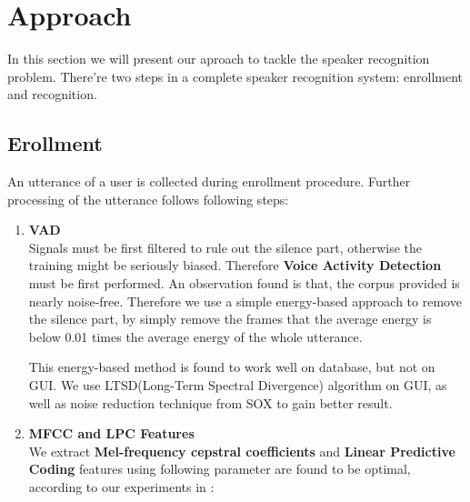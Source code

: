 \section{Approach}
	In this section we will present our aproach to tackle the speaker recognition problem.
	There're two steps in a complete speaker recognition system: enrollment and recognition.

\subsection{Erollment}
	\label{sec:approach_enrollment}
	An utterance of a user is collected during enrollment procedure.
	Further processing of the utterance follows following steps:
	\begin{enumerate}
		\item \textbf{VAD} \\
            Signals must be first filtered to rule out the silence part, otherwise the
            training might be seriously biased. Therefore \textbf{Voice Activity Detection} must
            be first performed.
			An observation found is that, the corpus provided is nearly noise-free.
            Therefore we use a simple energy-based approach
			to remove the silence part, by simply remove the frames that the average
            energy is below 0.01 times the average energy of the whole utterance.

            This energy-based method is found to work well on database, but not
            on GUI. We use LTSD(Long-Term Spectral Divergence) \cite{ltsd1} algorithm on GUI, as well as
            noise reduction technique from SOX\cite{sox} to gain better result.

		\item \textbf{MFCC and LPC Features} \\ We extract
          \textbf{Mel-frequency cepstral coefficients} and \textbf{Linear Predictive
			Coding} features using following parameter are found to be
			optimal, according to our experiments in :


\end{enumerate}
